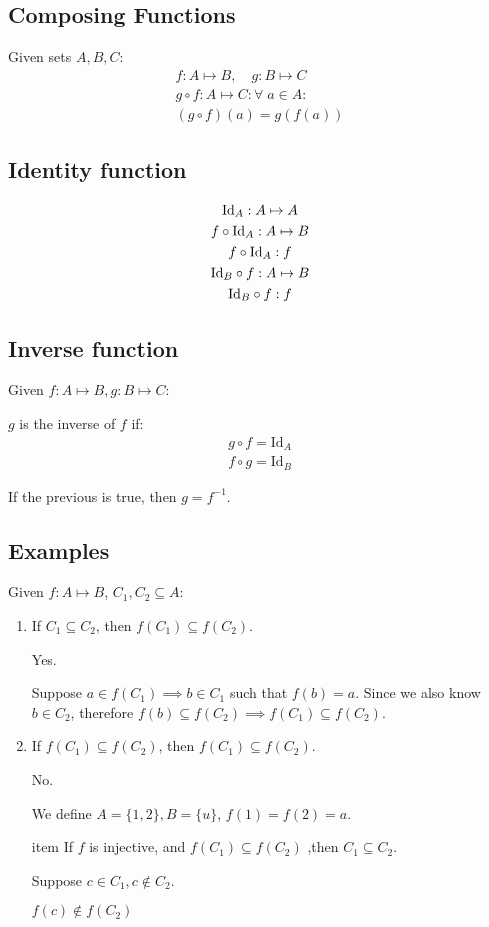 \documentclass[00_complete]{subfiles}
\begin{document}
\subsection{Composing Functions}

Given sets $A, B, C$:
\begin{gather*}
f: A \mapsto B, \quad g: B \mapsto C \\
g \circ f: A \mapsto C: \forall \; a \in A: \\
(g \circ f)(a) = g(f(a))
\end{gather*}

\subsection{Identity function}

\begin{gather*}
\operatorname{Id}_A: A \mapsto A \\
f \circ \mathrm{Id}_A: A \mapsto B \\
f \circ \mathrm{Id}_A: f \\
\mathrm{Id}_B \circ f: A \mapsto B \\
\mathrm{Id}_B \circ f: f
\end{gather*}

\subsection{Inverse function}

Given $f: A \mapsto B, g: B \mapsto C$:

$g$ is the inverse of $f$ if:
\begin{gather*}
g \circ f = \mathrm{Id}_A \\
f \circ g = \mathrm{Id}_B
\end{gather*}

If the previous is true, then $g = f^{-1}$.

\subsection{Examples}
\begin{example}

Given $f:A \mapsto B$, $C_1, C_2 \subseteq A$:
\begin{enumerate}
\item If $C_1 \subseteq C_2$, then $f(C_1) \subseteq f(C_2)$.

Yes.

Suppose $a \in f(C_1) \implies b \in C_1$ such that $f(b)=a$. Since we also
know $b \in C_2$, therefore $f(b) \subseteq f(C_2) \implies f(C_1) \subseteq f(C_2)$.

\item If $f(C_1) \subseteq f(C_2)$, then $f(C_1) \subseteq f(C_2)$.

No.

We define $A=\{1,2\}, B=\{u\}$, $f(1)=f(2)=a$.

item If $f$ is injective, and $f(C_1) \subseteq f(C_2)$ ,then $C_1 \subseteq
C_2$.

Suppose $c \in C_1, c \notin C_2$.

$f(c) \notin f(C_2)$
\end{enumerate}
\end{example}
\end{document}
